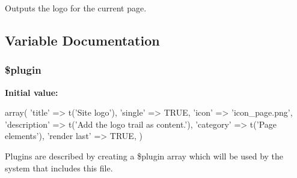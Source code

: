 Outputs the logo for the current page. 

\subsection{Variable Documentation}
\hypertarget{page__logo_8inc_ada8a7130088351710bb02ed622d6bf65}{
\subsubsection[{\$plugin}]{\setlength{\rightskip}{0pt plus 5cm}\$plugin}}
\label{page__logo_8inc_ada8a7130088351710bb02ed622d6bf65}
{\bfseries Initial value:}
\begin{DoxyCode}
 array(
  'title' => t('Site logo'),
  'single' => TRUE,
  'icon' => 'icon_page.png',
  'description' => t('Add the logo trail as content.'),
  'category' => t('Page elements'),
  'render last' => TRUE,
)
\end{DoxyCode}
Plugins are described by creating a \$plugin array which will be used by the system that includes this file. 